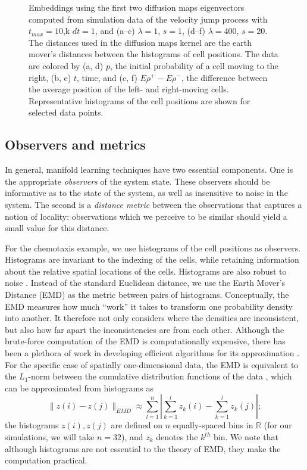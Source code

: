 \documentclass[3p]{elsarticle}
\begin{document}
\begin{figure}[t!]
\begin{subfigure}{\figwidth}
\caption{}
\label{subfig:large_lambda_rho}
\end{subfigure}
\caption{Embeddings using the first two diffusion maps eigenvectors computed from simulation data of the velocity jump process with $t_{max} = 10$,k $dt=1$, and (a--c) $\lambda=1$, $s=1$, (d--f) $\lambda=400$, $s=20$.  The distances used in the diffusion maps kernel are the earth mover's distances between the histograms of cell positions. The data are colored by (a, d) $p$, the initial probability of a cell moving to the right, (b, e) $t$, time, and (c, f) $E \rho^+ - E \rho^-$, the difference between the average position of the left- and right-moving cells. Representative histograms of the cell positions are shown for selected data points. }
\label{fig:dmaps_embed_emd}
\end{figure}

\subsection{Observers and metrics}

In general, manifold learning techniques have two essential components.
%
One is the appropriate {\em observers} of the system state.
%
These observers should be informative as to the state of the system, as well as insensitive to noise in the system.
%
The second is a {\em distance metric} between the observations that captures a notion of locality: 
observations which we perceive to be similar should yield a small value for this distance.

For the chemotaxis example, we use histograms of the cell positions as observers.
%
Histograms are invariant to the indexing of the cells, while retaining information about the relative spatial locations of the cells.
%
Histograms are also robust to noise \cite{talmon2013empirical}.
%
Instead of the standard Euclidean distance, we use the Earth Mover's Distance (EMD) \cite{rubner2000earth} as the metric between pairs of histograms.
%
Conceptually, the EMD measures how much ``work'' it takes to transform one probability density into another.
%
It therefore not only considers where the densities are inconsistent, but also how far apart the inconsistencies are from each other.
%
Although the brute-force computation of the EMD is computationally expensive, 
there has been a plethora of work in developing efficient algorithms for its approximation \cite{Pele-eccv2008, Pele-iccv2009, leeb2014lipschitz}.
%
For the specific case of spatially one-dimensional data, the EMD is equivalent to the $L_1$-norm between the 
cumulative distribution functions of the data \cite{rubner2000perceptual}, which can be approximated from histograms as
\begin{equation}
\| z(i) - z(j) \|_{EMD} \approx \sum_{l=1}^{n} \left| \sum_{k=1}^l z_k(i) - \sum_{k=1}^l z_k(j) \right|;
\end{equation}
the histograms $z(i), z(j)$ are defined on $n$ equally-spaced bins in $\mathbb{R}$ (for our simulations, we will take $n=32$), and $z_k$ denotes the $k^{th}$ bin.
%
We note that although histograms are not essential to the theory of EMD, they make the computation practical.
\end{document}
